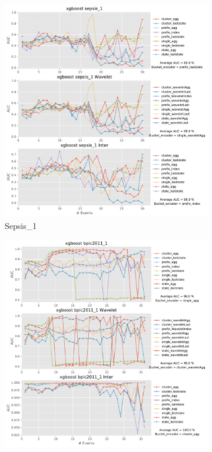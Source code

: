 \documentclass[twoside,11pt]{Latex/Classes/PhDthesisPSnPDF}
\begin{document}
\begin{figure}[!htbp] %

	\begin{subfigure}{0.48\textwidth}
		\includegraphics[width=\linewidth]{images/inter/xgboost/sepsis_1.pdf}
		\caption{Sepsis\_1} \label{fig:sepsisi}
	\end{subfigure}\hspace*{\fill}
	\begin{subfigure}{0.48\textwidth}
		\includegraphics[width=\linewidth]{images/inter/xgboost/bpic2011_1.pdf}

\end{subfigure}
\end{figure}
\end{document}
